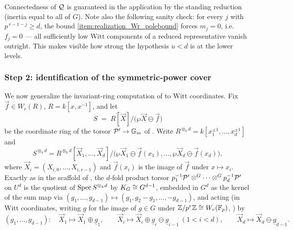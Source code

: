 \begin{rem*}\label{rem:realization_Wr_sanity}
    Connectedness of $\mathcal{Q}$ is guaranteed in the application by the standing reduction
    (inertia equal to all of $G$). Note also the following sanity check: for every
    $j$ with $p^{\,r-1-j} \geq d$, the bound \ref{item:realization_Wr_polebound}
    forces $m_j = 0$, i.e.\ $f_j = 0$ --- all sufficiently low Witt components of a
    reduced representative vanish outright. This makes visible how strong the
    hypothesis $u < d$ is at the lower levels.
\end{rem*}

\subsubsection*{Step 2: identification of the symmetric-power cover}

We now generalize the invariant-ring computation of
 to Witt coordinates. Fix
$\vec f \in W_r(R)$, $R = k[x, x^{-1}]$, and let
\[
S \;=\; R[\vec X]\big/\bigl(\wp \vec X \ominus \vec f\bigr)
\]
be the coordinate ring of the torsor $\mathcal{P}' \to \mathbb{G}_m$ of
. Write
$R^{\otimes_k d} = k[x_1^{\pm 1}, \dots, x_d^{\pm 1}]$ and
\[
S^{\otimes_k d}
= R^{\otimes_k d}[\vec X_1, \dots, \vec X_d]\big/
\bigl(\wp \vec X_1 \ominus \vec f(x_1), \dots, \wp \vec X_d \ominus \vec f(x_d)\bigr),
\]
where $\vec X_i = (X_{i,0}, \dots, X_{i,r-1})$ and $\vec f(x_i)$ is the image of
$\vec f$ under $x \mapsto x_i$. Exactly as in the scaffold of
, the $d$-fold product torsor
$p_1^{-1}\mathcal{P}' \otimes^G \cdots \otimes^G p_d^{-1}\mathcal{P}'$ on $U^d$ is the quotient of
$\operatorname{Spec} S^{\otimes_k d}$ by $K_{G} \cong G^{d-1}$, embedded in $G^d$ as the kernel of the
sum map via $(g_1, \dots, g_{d-1}) \mapsto (g_1, g_2 - g_1, \dots, -g_{d-1})$, and
acting (in Witt coordinates, writing $\underline g$ for the image of $g \in G$ under
$\mathbb{Z}/p^r\mathbb{Z} \cong W_r(\mathbb{F}_p)$, ) by
\[
(g_1, \dots, g_{d-1}) \colon \quad
\vec X_1 \mapsto \vec X_1 \oplus \underline g_1, \qquad
\vec X_i \mapsto \vec X_i \oplus \underline g_i \ominus \underline g_{i-1}
\ (1 < i < d), \qquad
\vec X_d \mapsto \vec X_d \ominus \underline g_{d-1}.
\]

